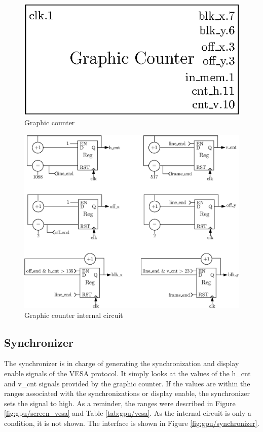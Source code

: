 \begin{figure}[H]
    \centering
    \includegraphics[scale=0.8]{Chapter4-GPU_CLKU/res/gc}
    \caption{Graphic counter}
    \label{fig:gpu/gc}
\end{figure}

\begin{figure}[H]
    \centering
    \includegraphics[width=\linewidth]{Chapter4-GPU_CLKU/res/gc_in}
    \caption{Graphic counter internal circuit}
    \label{fig:gpu/gc_in}
\end{figure}

\subsection{Synchronizer}

The synchronizer is in charge of generating the synchronization and display enable signals of the
VESA protocol. It simply looks at the values of the h\_cnt and v\_cnt signals provided by the 
graphic counter. If the values are within the ranges associated with the synchronizations or display
enable, the synchronizer sets the signal to high. As a reminder, the ranges were described in 
Figure \ref{fig:gpu/screen_vesa} and Table \ref{tab:gpu/vesa}. As the internal circuit is 
only a condition, it is not shown. The interface is shown in Figure \ref{fig:gpu/synchronizer}.  

